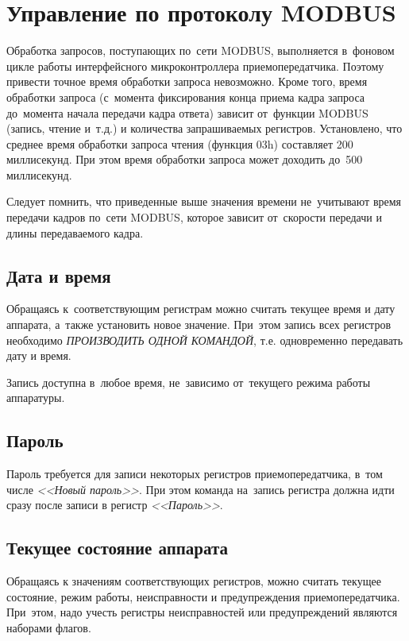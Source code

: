 \section{Управление по протоколу MODBUS} \label{sec:control}

Обработка запросов, поступающих по~сети MODBUS, выполняется в~фоновом цикле работы интерфейсного микроконтроллера приемопередатчика. Поэтому привести точное время обработки запроса невозможно. Кроме того, время обработки запроса (с~момента фиксирования конца приема кадра запроса до~момента начала передачи кадра ответа) зависит от~функции MODBUS (запись, чтение и~т.д.) и количества запрашиваемых регистров. Установлено, что среднее время обработки запроса чтения (функция 03h) составляет 200 миллисекунд. При этом время обработки запроса может доходить до~500 миллисекунд.

Следует помнить, что приведенные выше значения времени не~учитывают время передачи кадров по~сети MODBUS, которое зависит от~скорости передачи и длины передаваемого кадра.

\subsection{Дата и время}

Обращаясь к~соответствующим регистрам можно считать текущее время и дату аппарата, а~также установить новое значение. При~этом запись всех регистров необходимо \MakeUppercase{\textit{производить одной командой}}, т.е. одновременно передавать дату и время.

Запись доступна в~любое время, не~зависимо от~текущего режима работы аппаратуры.

\subsection{Пароль}

Пароль требуется для записи некоторых регистров приемопередатчика, в~том числе \textit{<<Новый пароль>>}. При этом команда на~запись регистра должна идти сразу после записи в регистр \textit{<<Пароль>>}.

\subsection{Текущее состояние аппарата}

Обращаясь к значениям соответствующих регистров, можно считать текущее состояние, режим работы, неисправности и предупреждения приемопередатчика. При~этом, надо учесть регистры неисправностей или предупреждений являются наборами флагов.

